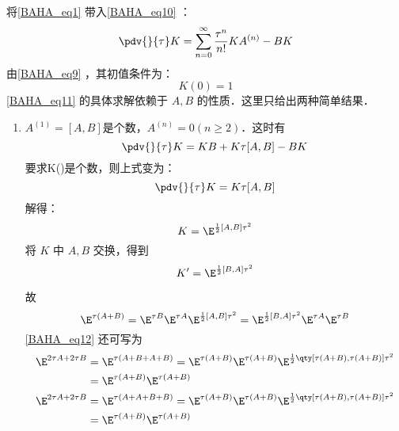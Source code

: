 将\autoref{BAHA_eq1} 带入\autoref{BAHA_eq10} ：
\begin{equation}\label{BAHA_eq11}
\pdv{}{\tau}K=\sum_{n=0}^{\infty}\frac{\tau^n}{n!}KA^{(n)}-BK
\end{equation}
由\autoref{BAHA_eq9} ，其初值条件为：
\begin{equation}
K(0)=1
\end{equation}
\autoref{BAHA_eq11} 的具体求解依赖于 $A,B$ 的性质．这里只给出两种简单结果．
\begin{enumerate}
\item $A^{(1)}=[A,B]$是个数，$A^{(n)}=0(n\geq 2)$．这时有
\begin{equation}
\pdv{}{\tau}K=KB+K\tau[A,B]-BK
\end{equation}
要求K(\tau)是个数，则上式变为：
\begin{equation}
\pdv{}{\tau}K=K\tau[A,B]
\end{equation}
解得：
\begin{equation}
K=\E^{\frac{1}{2}[A,B]\tau^2}
\end{equation}
将 $K$ 中 $A,B$ 交换，得到 
\begin{equation}
K'=\E^{\frac{1}{2}[B,A]\tau^2}
\end{equation}

故
\begin{equation}\label{BAHA_eq12}
\E^{\tau(A+B)}=\E^{\tau B}\E^{\tau A}\E^{\frac{1}{2}[A,B]\tau^2}=\E^{\frac{1}{2}[B,A]\tau^2}\E^{\tau A}\E^{\tau B}
\end{equation}
\autoref{BAHA_eq12} 还可写为
\begin{equation}
\begin{aligned}
\E^{2\tau A+2\tau B}&=\E^{\tau(A+B+A+B)}=\E^{\tau (A+B)}\E^{\tau (A+B)}\E^{\frac{1}{2}\qty[\tau(A+B),\tau(A+B)]\tau^2}\\
&=\E^{\tau(A+B)}\E^{\tau(A+B)}\\
\E^{2\tau A+2\tau B}&=\E^{\tau(A+A+B+B)}=\E^{\tau (A+B)}\E^{\tau (A+B)}\E^{\frac{1}{2}\qty[\tau(A+B),\tau(A+B)]\tau^2}\\
&=\E^{\tau(A+B)}\E^{\tau(A+B)}
\end{aligned}
\end{equation}

\end{enumerate}


